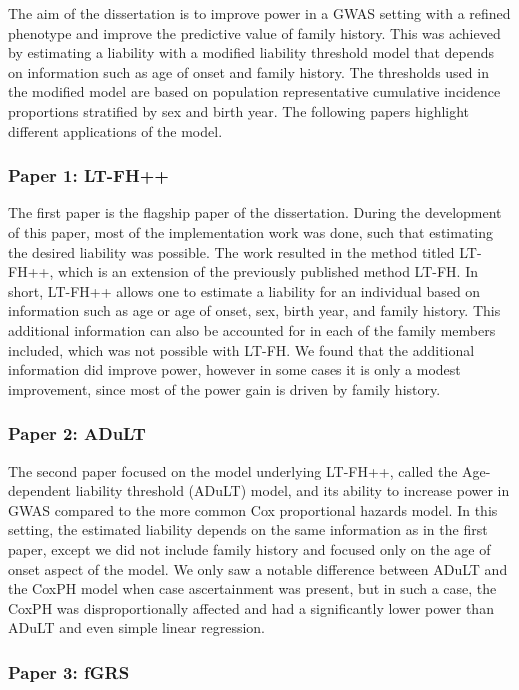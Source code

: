 The aim of the dissertation is to improve power in a GWAS setting with a refined phenotype and improve the predictive value of family history. This was achieved by estimating a liability with a modified liability threshold model that depends on information such as age of onset and family history. The thresholds used in the modified model are based on population representative cumulative incidence proportions stratified by sex and birth year. The following papers highlight different applications of the model.


\subsubsection{Paper 1: LT-FH++}
The first paper is the flagship paper of the dissertation. During the development of this paper, most of the implementation work was done, such that estimating the desired liability was possible. The work resulted in the method titled LT-FH++, which is an extension of the previously published method LT-FH. In short, LT-FH++ allows one to estimate a liability for an individual based on information such as age or age of onset, sex, birth year, and family history. This additional information can also be accounted for in each of the family members included, which was not possible with LT-FH. We found that the additional information did improve power, however in some cases it is only a modest improvement, since most of the power gain is driven by family history.

\subsubsection{Paper 2: ADuLT}
The second paper focused on the model underlying LT-FH++, called the Age-dependent liability threshold (ADuLT) model, and its ability to increase power in GWAS compared to the more common Cox proportional hazards model. In this setting, the estimated liability depends on the same information as in the first paper, except we did not include family history and focused only on the age of onset aspect of the model. We only saw a notable difference between ADuLT and the CoxPH model when case ascertainment was present, but in such a case, the CoxPH was disproportionally affected and had a significantly lower power than ADuLT and even simple linear regression.

\subsubsection{Paper 3: fGRS}
